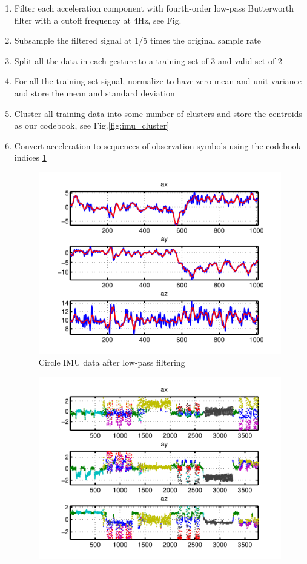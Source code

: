 \documentclass[twoside]{article}
\begin{document}
\begin{multicols}{2}
\begin{enumerate}
	\item Filter each acceleration component with fourth-order low-pass Butterworth filter with a cutoff frequency at 4Hz, see Fig.
	\item Subsample the filtered signal at 1/5 times the original sample rate
	\item Split all the data in each gesture to a training set of 3 and valid set of 2
	\item For all the training set signal, normalize to have zero mean and unit variance and store the mean and standard deviation
	\item Cluster all training data into some number of clusters and store the centroids as our codebook, see Fig.\ref{fig:imu_cluster}\\
	\item Convert acceleration to sequences of observation symbols using the codebook indices
	\ref{fig:imu_filt}
	\begin{figure}[H]
\centering
\includegraphics[width=\columnwidth]{fig/filter.pdf}
\caption{Circle IMU data after low-pass filtering}
\label{fig:imu_filt}
\end{figure}
\begin{figure}[H]
\centering
\includegraphics[width=\columnwidth]{fig/cluster.pdf}

\end{figure}
\end{enumerate}
\end{multicols}
\end{document}
